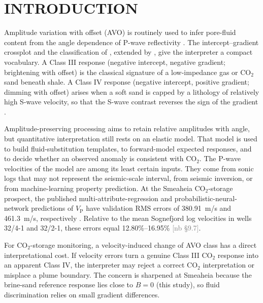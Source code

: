 \documentclass[11pt]{article}
\newcommand{\VP}{V_\mathrm{P}}
\newif\ifshownb \shownbtrue
\newcommand{\nb}[1]{\ifshownb\textcolor{gray}{[nb #1]}\fi}
\begin{document}
\section*{INTRODUCTION}

Amplitude variation with offset (AVO) is routinely used to infer pore-fluid content from the angle dependence of P-wave reflectivity \citep{rutherford1989,castagna1993,castagna1998}. The intercept--gradient crossplot and the classification of \citet{rutherford1989}, extended by \citet{castagna1998}, give the interpreter a compact vocabulary. A Class III response (negative intercept, negative gradient; brightening with offset) is the classical signature of a low-impedance gas or CO$_2$ sand beneath shale. A Class IV response (negative intercept, positive gradient; dimming with offset) arises when a soft sand is capped by a lithology of relatively high S-wave velocity, so that the S-wave contrast reverses the sign of the gradient \citep{castagna1998}.

Amplitude-preserving processing aims to retain relative amplitudes with angle, but quantitative interpretation still rests on an elastic model. That model is used to build fluid-substitution templates, to forward-model expected responses, and to decide whether an observed anomaly is consistent with CO$_2$. The P-wave velocities of the model are among its least certain inputs. They come from sonic logs that may not represent the seismic-scale interval, from seismic inversion, or from machine-learning property prediction. At the Smeaheia CO$_2$-storage prospect, the published multi-attribute-regression and probabilistic-neural-network predictions of $\VP$ have validation RMS errors of \SI{380.91}{m/s} and \SI{461.3}{m/s}, respectively \citep[][their Table 12]{hema2027}. Relative to the mean Sognefjord log velocities in wells 32/4-1 and 32/2-1, these errors equal 12.80\%--16.95\% \nb{\S9.7}.

For CO$_2$-storage monitoring, a velocity-induced change of AVO class has a direct interpretational cost. If velocity errors turn a genuine Class III CO$_2$ response into an apparent Class IV, the interpreter may reject a correct CO$_2$ interpretation or misplace a plume boundary. The concern is sharpened at Smeaheia because the brine-sand reference response lies close to $B=0$ (this study), so fluid discrimination relies on small gradient differences.
\end{document}
